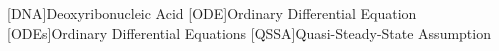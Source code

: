 \begin{acronym}

  [DNA]{Deoxyribonucleic Acid}
  [ODE]{Ordinary Differential Equation}
  [ODEs]{Ordinary Differential Equations}
  [QSSA]{Quasi-Steady-State Assumption}

\end{acronym}
